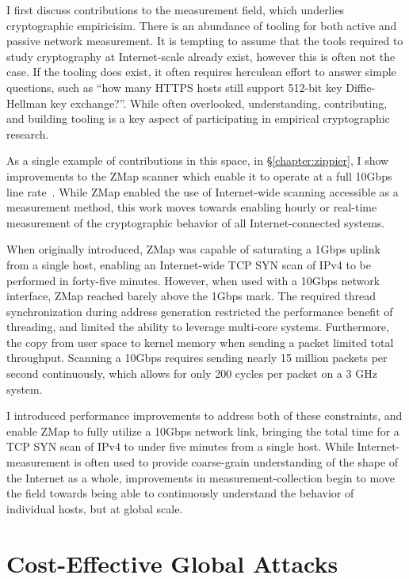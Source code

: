 I first discuss contributions to the measurement field, which underlies
cryptographic empiricisim. There is an abundance of tooling for both active and
passive network measurement. It is tempting to assume that the tools required
to study cryptography at Internet-scale already exist, however this is often
not the case. If the tooling does exist, it often requires herculean effort to
answer simple questions, such as ``how many HTTPS hosts still support 512-bit
key Diffie-Hellman key exchange?''. While often overlooked, understanding,
contributing, and building tooling is a key aspect of participating in
empirical cryptographic research.

As a single example of contributions in this space, in \S\ref{chapter:zippier},
I show improvements to the ZMap scanner which enable it to operate at a full
10Gbps line rate~\cite{zippier-zmap-2014}.  While ZMap enabled the use of
Internet-wide scanning accessible as a measurement method, this work moves
towards enabling hourly or real-time measurement of the cryptographic behavior
of all Internet-connected systems.

When originally introduced, ZMap was capable of saturating a 1Gbps uplink from
a single host, enabling an Internet-wide TCP SYN scan of IPv4 to be performed
in forty-five minutes. However, when used with a 10Gbps network interface, ZMap
reached barely above the 1Gbps mark. The required thread synchronization during
address generation restricted the performance benefit of threading, and limited
the ability to leverage multi-core systems. Furthermore, the copy from user
space to kernel memory when sending a packet limited total throughput. Scanning
a 10Gbps requires sending nearly 15 million packets per second continuously,
which allows for only 200 cycles per packet on a 3 GHz system.

I introduced performance improvements to address both of these constraints, and
enable ZMap to fully utilize a 10Gbps network link, bringing the total time for
a TCP SYN scan of IPv4 to under five minutes from a single host. While
Internet-measurement is often used to provide coarse-grain understanding of the
shape of the Internet as a whole, improvements in measurement-collection begin
to move the field towards being able to continuously understand the behavior of
individual hosts, but at global scale.

\section{Cost-Effective Global Attacks}

